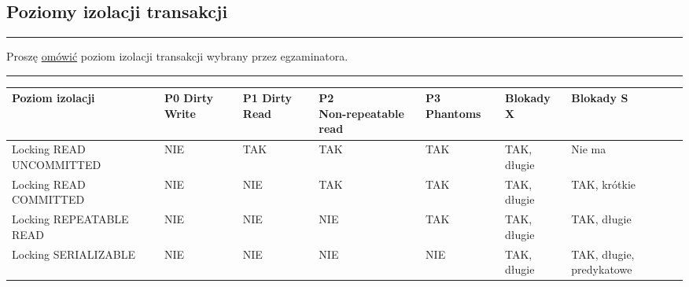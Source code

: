 \documentclass[a5paper,6pt]{article}
\newcommand{\horrule}[1]{\rule{\linewidth}{#1}}
\begin{document}
    \subsection{Poziomy izolacji transakcji} %
    \label{sub:poziomy_izolacji_transakcji}

    \horrule{0.5pt}
    Proszę \underline{omówić} poziom izolacji transakcji wybrany przez
    egzaminatora.\\
    \horrule{0.5pt}

    \vskip 1cm

\begin{adjustbox}{width=\columnwidth,center}
    \begin{tabular}{|p{3cm}|p{1cm}|p{1cm}|p{2cm}|p{1cm}|p{1.3cm}|p{1.3cm}|}
      \hline
      \textbf{Poziom izolacji} &
      \textbf{P0 Dirty Write} &
      \textbf{P1 Dirty Read} &
      \textbf{P2 \newline Non-repeatable read} &
      \textbf{P3 Phantoms} &
      \textbf{Blokady X} &
      \textbf{Blokady S}\\
      \hline
      Locking READ \newline UNCOMMITTED &
      \cellcolor{red!25} NIE   &
      \cellcolor{green!25} TAK &
      \cellcolor{green!25} TAK &
      \cellcolor{green!25} TAK &
      \cellcolor{yellow!25} TAK, długie &
      Nie ma\\
      \hline
      Locking READ \newline COMMITTED &
      \cellcolor{red!25} NIE   &
      \cellcolor{red!25} NIE   &
      \cellcolor{green!25} TAK &
      \cellcolor{green!25} TAK &
      \cellcolor{yellow!25} TAK, długie &
      \cellcolor{yellow!15} TAK, krótkie\\
      \hline
      Locking REPEATABLE READ  &
      \cellcolor{red!25} NIE   &
      \cellcolor{red!25} NIE   &
      \cellcolor{red!25} NIE   &
      \cellcolor{green!25} TAK &
      \cellcolor{yellow!25} TAK, długie &
      \cellcolor{yellow!25} TAK, długie\\
      \hline
      Locking \newline SERIALIZABLE &
      \cellcolor{red!25} NIE &
      \cellcolor{red!25} NIE &
      \cellcolor{red!25} NIE &
      \cellcolor{red!25} NIE &
      \cellcolor{yellow!25} TAK, długie &
      \cellcolor{blue!25} TAK, długie, predykatowe\\
      \hline

    \end{tabular}
\end{adjustbox}
    \vskip 1cm
\end{document}

